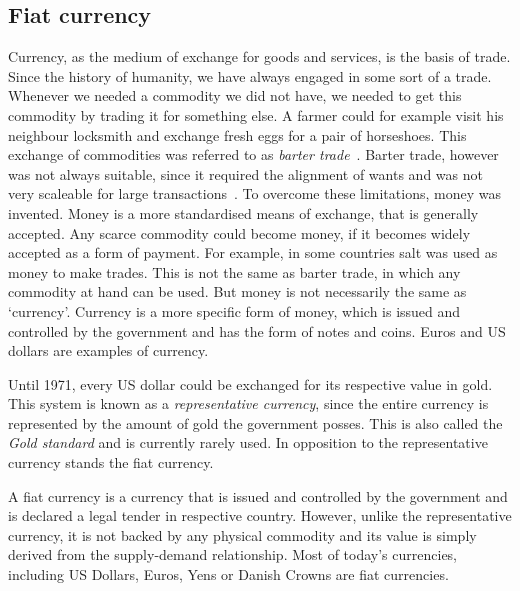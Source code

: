 \subsection{Fiat  currency}
% 
Currency, as the medium of exchange for goods and services, is the basis of trade. Since the history of humanity, we have always engaged in some sort of a trade. Whenever we needed a commodity we did not have, we needed to get this commodity by trading it for something else. A farmer could for example visit his neighbour locksmith and exchange fresh eggs for a pair of horseshoes. This exchange of commodities was referred to as \textit{barter trade}~\cite{Sullivan2009BarterEconomics}. Barter trade, however was not always suitable, since it required the alignment of wants and was not very scaleable for large transactions~\cite{Carroll2015CreatingExchange}. To overcome these limitations, money was invented. Money is a more standardised means of exchange, that is generally accepted. Any scarce commodity could become money, if it becomes widely accepted as a form of payment. For example, in some countries salt was used as money to make trades. This is not the same as barter trade, in which any commodity at hand can be used. But money is not necessarily the same as `currency'. Currency is a more specific form of money, which is issued and controlled by the government and has the form of notes and coins\footnotemark. Euros and US dollars are examples of currency.
% 

Until 1971, every US dollar could be exchanged for its respective value in gold. This system is known as a \textit{representative currency}, since the entire currency is represented by the amount of gold the government posses. This is also called the \textit{Gold standard} and is currently rarely used. In opposition to the representative currency stands the fiat currency. 

A fiat currency is a currency that is issued and controlled by the government and is declared a legal tender in respective country. However, unlike the representative currency, it is not backed by any physical commodity and its value is simply derived from the supply-demand relationship\footnotemark. Most of today's currencies, including US Dollars, Euros, Yens or Danish Crowns are fiat currencies.
% 
